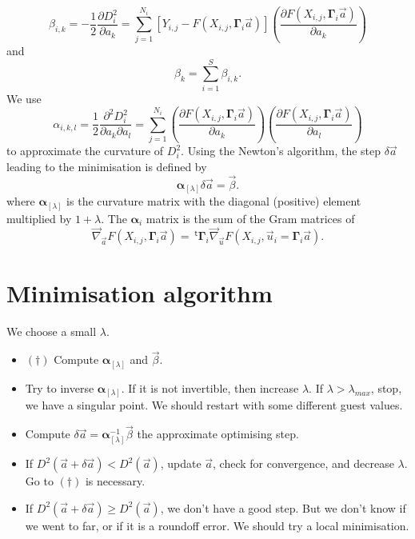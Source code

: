 \documentclass[aps,twocolumn]{revtex4}
\newcommand{\mymat}[1]{\boldsymbol{#1}}
\newcommand{\mytrn}[1]{~^{\mathsf{t}}#1}
\begin{document}
\begin{equation}
	\beta_{i,k} = -\dfrac{1}{2}\dfrac{\partial D_i^2}{\partial a_k} 
	= \sum_{j=1}^{N_i} \left[
	Y_{i,j} - F\left(X_{i,j},\mymat{\Gamma}_i \vec{a}\right)
	\right] 
	\left(\dfrac{\partial F(X_{i,j},\mymat{\Gamma}_i \vec{a})}{\partial a_k}\right)
\end{equation}
and
\begin{equation}
	\beta_k = \sum_{i=1}^{S} \beta_{i,k}.
\end{equation}
We use
\begin{equation}
	\alpha_{i,k,l} = \dfrac{1}{2} \dfrac{\partial^2 D_i^2}{\partial a_k\partial a_l} =
	\sum_{j=1}^{N_i} 
	 \left(\dfrac{\partial F(X_{i,j},\mymat{\Gamma}_i \vec{a})}{\partial a_k}\right) \left(\dfrac{\partial F(X_{i,j},\mymat{\Gamma}_i \vec{a})}{\partial a_l}\right) 
\end{equation}
to approximate the curvature of $D_i^2$.
Using the Newton's algorithm, the step $\delta\vec{a}$ leading to the minimisation is defined by
\begin{equation}
	\mymat{\alpha}_{[\lambda]} \delta\vec{a} = \vec{\beta}.
\end{equation}
where $\mymat{\alpha}_{[\lambda]}$ is the curvature matrix with the diagonal (positive) element multiplied by $1+\lambda$.
The $\mymat{\alpha}_i$ matrix is the sum of the Gram matrices
of
\begin{equation}
	\vec{\nabla}_{\vec{a}} F(X_{i,j},\mymat{\Gamma}_i \vec{a})
	= \mytrn{\mymat{\Gamma}}_i 
	 \vec{\nabla}_{\vec{u}} F(X_{i,j},\vec{u}_i = \mymat{\Gamma}_i \vec{a}).
\end{equation}

\section{Minimisation algorithm}
We choose a small $\lambda$.

\begin{itemize}
\item $(\dagger)$ Compute $\mymat{\alpha}_{[\lambda]}$ and $\vec{\beta}$.
\item Try to inverse $\mymat{\alpha}_{[\lambda]}$. If it is not invertible, then increase $\lambda$. If $\lambda>\lambda_{max}$, 
stop, we have a singular point. We should restart with some different guest values.
\item Compute $\delta\vec{a}=\mymat{\alpha}_{[\lambda]}^{-1}\vec{\beta}$ the approximate optimising step.
\item If $D^2(\vec{a}+\delta\vec{a})<D^2(\vec{a})$, update $\vec{a}$, check for convergence, and decrease $\lambda$.
Go to $(\dagger)$ is necessary.
\item If $D^2(\vec{a}+\delta\vec{a})\geq D^2(\vec{a})$, we don't have a good step.
But we don't know if we went to far, or if it is a roundoff error.
We should try a local minimisation.
\end{itemize}
\end{document}
